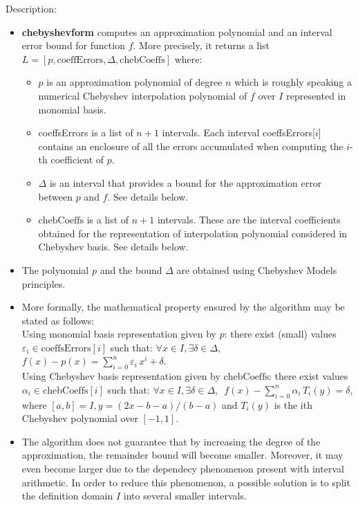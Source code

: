 \noindent Description: \begin{itemize}

\item \textbf{chebyshevform} computes an approximation polynomial and an interval error bound
   for function $f$. More precisely, it returns a list $L = \left[p, \textrm{coeffErrors},\Delta,\textrm{chebCoeffs} \right]$
   where:
   \begin{itemize}
   \item $p$ is an approximation polynomial of degree $n$ which is roughly speaking
   a numerical Chebyshev interpolation polynomial of $f$ over $I$ represented in monomial basis.
   \item coeffsErrors is a list of $n+1$ intervals. Each interval coeffsErrors[$i$]
   contains an enclosure of all the errors accumulated when computing the $i$-th
   coefficient of $p$.
   \item $\Delta$ is an interval that provides a bound for the approximation error
   between $p$ and $f$. See details below.
   \item $\textrm{chebCoeffs}$ is a list of $n+1$ intervals. These are the interval coefficients obtained for the representation of interpolation polynomial considered in Chebyshev basis. See details below.
   \end{itemize}

\item The polynomial $p$ and the bound  $\Delta$ are obtained using Chebyshev Models
   principles.

\item More formally, the mathematical property ensured by the algorithm may be
   stated as follows:
   \\
   Using monomial basis representation given by $p$: there exist (small) values $\varepsilon_i \in \textrm{coeffsErrors}[i]$ such that:
   $\forall x \in I, \exists \delta \in \Delta,\,$
   $f(x)-p(x) = \sum\limits_{i=0}^{n} \varepsilon_i\, x^i + \delta$.
   \\
   Using Chebyshev basis representation given by $\textrm{chebCoeffs}$: there exist values $\alpha_i \in \textrm{chebCoeffs}[i]$ such that:
    $\forall x \in I, \exists \delta \in \Delta,\,$
   $f(x)-\sum\limits_{i=0}^{n} \alpha_i\, T_i(y)= \delta$, where $[a,b]=I, y=(2x-b-a)/(b-a)$ and  $T_i(y)$ is the ith Chebyshev polynomial over  $[-1,1]$.

\item The algorithm does not guarantee that by increasing the degree of the
   approximation, the remainder bound will become smaller. Moreover, it may 
   even become larger due to the dependecy phenomenon present with interval
   arithmetic. In order to reduce this phenomenon, a possible solution is to
   split the definition domain $I$ into several smaller intervals. 
\end{itemize}
